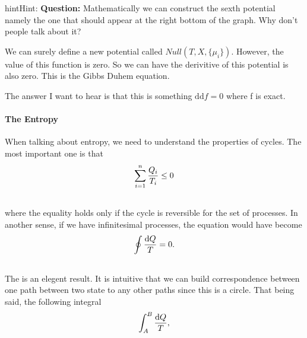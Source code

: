 \documentclass[letterpaper,10pt,english]{sphinxmanual}
\begin{document}
\begin{notice}{hint}{Hint:}
\textbf{Question:} Mathematically we can construct the sexth potential namely the one that should appear at the right bottom of the graph. Why don't people talk about it?

We can surely define a new potential called $Null(T,X,\{\mu_i\})$. However, the value of this function is zero. So we can have the derivitive of this potential is also zero. This is the Gibbs Duhem equation.

The answer I want to hear is that this is something $\mathrm d\mathrm d f = 0$ where f is exact.
\end{notice}


\paragraph{The Entropy}
\label{vocabulary/vocabulary:index-4}\label{vocabulary/vocabulary:the-entropy}
When talking about entropy, we need to understand the properties of cycles. The most important one is that
\begin{gather}
\begin{split}\sum_{i=1}^n \frac{Q_i}{T_i} \leq 0\end{split}\notag\\\begin{split}\end{split}\notag
\end{gather}
where the equality holds only if the cycle is reversible for the set of processes. In another sense, if we have infinitesimal processes, the equation would have become
\begin{gather}
\begin{split}\oint \frac{\mathrm d Q}{T} = 0 .\end{split}\notag\\\begin{split}\end{split}\notag
\end{gather}
The is an elegent result. It is intuitive that we can build correspondence between one path between two state to any other paths since this is a circle. That being said, the following integral
\begin{gather}
\begin{split}\int_A^B \frac{\mathrm d Q}{T},\end{split}\notag\\\begin{split}\end{split}\notag
\end{gather}
\end{document}
